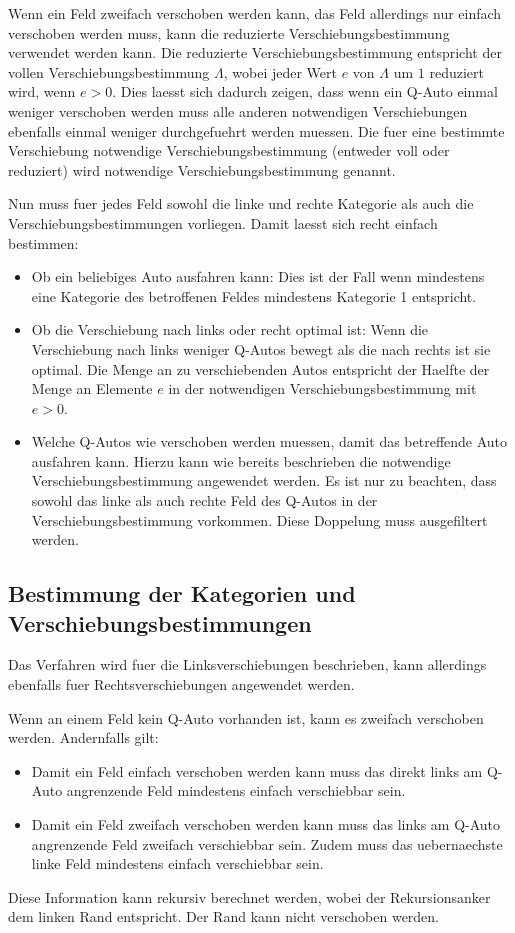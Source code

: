 \documentclass[a4paper,10pt,ngerman]{scrartcl}
\begin{document}
Wenn ein Feld zweifach verschoben werden kann, das Feld allerdings nur einfach verschoben werden muss, kann die reduzierte Verschiebungsbestimmung verwendet werden kann.
Die reduzierte Verschiebungsbestimmung entspricht der vollen Verschiebungsbestimmung $\Lambda$, wobei jeder Wert $e$ von $\Lambda$ um $1$ reduziert wird, wenn $e>0$.
Dies laesst sich dadurch zeigen, dass wenn ein Q-Auto einmal weniger verschoben werden muss alle anderen notwendigen Verschiebungen ebenfalls einmal weniger durchgefuehrt werden muessen.
Die fuer eine bestimmte Verschiebung notwendige Verschiebungsbestimmung (entweder voll oder reduziert) wird notwendige Verschiebungsbestimmung genannt.

\medskip
Nun muss fuer jedes Feld sowohl die linke und rechte Kategorie als auch die Verschiebungsbestimmungen vorliegen.
Damit laesst sich recht einfach bestimmen:
\begin{itemize}
    \item Ob ein beliebiges Auto ausfahren kann:
          Dies ist der Fall wenn mindestens eine Kategorie des betroffenen Feldes mindestens Kategorie 1 entspricht.
    \item Ob die Verschiebung nach links oder recht optimal ist:
          Wenn die Verschiebung nach links weniger Q-Autos bewegt als die nach rechts ist sie optimal.
          Die Menge an zu verschiebenden Autos entspricht der Haelfte der Menge an Elemente $e$ in der notwendigen Verschiebungsbestimmung mit $e>0$.
    \item Welche Q-Autos wie verschoben werden muessen, damit das betreffende Auto ausfahren kann.
          Hierzu kann wie bereits beschrieben die notwendige Verschiebungsbestimmung angewendet werden.
          Es ist nur zu beachten, dass sowohl das linke als auch rechte Feld des Q-Autos in der Verschiebungsbestimmung vorkommen.
          Diese Doppelung muss ausgefiltert werden.
\end{itemize}

\subsection{Bestimmung der Kategorien und Verschiebungsbestimmungen}
Das Verfahren wird fuer die Linksverschiebungen beschrieben, kann allerdings ebenfalls fuer Rechtsverschiebungen angewendet werden.

Wenn an einem Feld kein Q-Auto vorhanden ist, kann es zweifach verschoben werden.
Andernfalls gilt:
\begin{itemize}
    \item Damit ein Feld einfach verschoben werden kann muss das direkt links am Q-Auto angrenzende Feld mindestens einfach verschiebbar sein.
    \item Damit ein Feld zweifach verschoben werden kann muss das links am Q-Auto angrenzende Feld zweifach verschiebbar sein.
          Zudem muss das uebernaechste linke Feld mindestens einfach verschiebbar sein.
\end{itemize}
Diese Information kann rekursiv berechnet werden, wobei der Rekursionsanker dem linken Rand entspricht.
Der Rand kann nicht verschoben werden.
\end{document}
